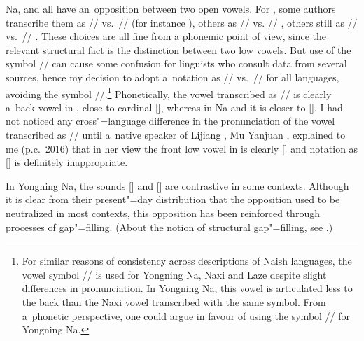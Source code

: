 			Na,  and  all have an~opposition between two open vowels. For , some authors transcribe
			them as // vs.\ // (for instance \citealt{heetal1989}), others as // vs.
			// \citep{fangetal1995}, others still as // vs.\ // \citep{fu1981, heetal1985, pinsonetal2012}. These choices are all fine from a phonemic point of view, since the relevant structural fact is the distinction between two low vowels. But use of the symbol // can cause some confusion for linguists who consult data from several sources, hence my decision to adopt a~notation as // vs.\ // for all 
			languages, avoiding the symbol //.\footnote{For similar reasons of consistency across descriptions of {Naish} languages, the vowel symbol // is used for Yongning Na, {Naxi} and {Laze} despite slight differences in pronunciation. In Yongning Na, this vowel is articulated less to the back than the {Naxi} vowel
			transcribed with the same symbol. From a~phonetic perspective, one could argue in favour of using
			the symbol // for Yongning Na.} Phonetically, the vowel transcribed as // is clearly a~back vowel in , close
			to cardinal [], whereas in Na and  it is closer to []. I had not noticed any
			cross"=language difference in the pronunciation of the vowel transcribed as // until a~native speaker of Lijiang , Mu Yanjuan , explained to me (p.c.\ 2016) that in her view the front low vowel in  is clearly [] and notation as [] is definitely inappropriate.
			
			In Yongning Na, the sounds [] and [] are contrastive in some contexts. Although it is clear from their
			present"=day distribution that the opposition used to be neutralized in most contexts, this opposition has been reinforced through processes of gap"=filling. (About the notion of structural gap"=filling, see .)
			
